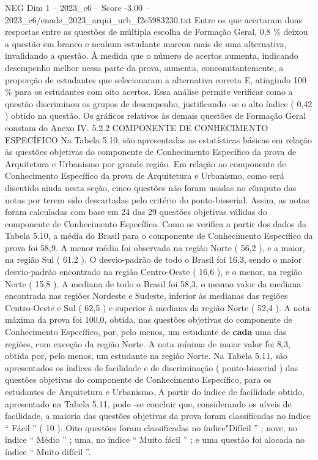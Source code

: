 \begin{textsample}{NEG Dim 1 – 2023\_c6 – Score -3.00 – 2023\_c6/enade\_2023\_arqui\_urb\_f2c5983230.txt}
Entre os que acertaram duas respostas entre as questões de múltipla escolha de Formação Geral, 0,8 \% deixou a questão em branco e nenhum estudante marcou mais de uma alternativa, invalidando a questão.
À medida que o número de acertos aumenta, indicando desempenho melhor nessa parte da prova, aumenta, concomitantemente, a proporção de estudantes que selecionaram a alternativa correta E, atingindo 100 \% para os estudantes com oito acertos.
Essa análise permite verificar como a questão discriminou os grupos de desempenho, justificando -se o alto índice ( 0,42 ) obtido na questão.
Os gráficos relativos às demais questões de Formação Geral constam do Anexo IV. 5.2.2 COMPONENTE DE CONHECIMENTO ESPECÍFICO Na Tabela 5.10, são apresentadas as estatísticas básicas em relação às questões objetivas do componente de Conhecimento Específico da prova de Arquitetura e Urbanismo por grande região.
Em relação ao componente de Conhecimento Específico da prova de Arquitetura e Urbanismo, como será discutido ainda nesta seção, cinco questões não foram usadas no cômputo das notas por terem sido descartadas pelo critério do ponto-bisserial.
Assim, as notas foram calculadas com base em 24 das 29 questões objetivas válidas do componente de Conhecimento Específico.
Como se verifica a partir dos dados da Tabela 5.10, a média do Brasil para o componente de Conhecimento Específico da prova foi 58,9.
A menor média foi observada na região Norte ( 56,2 ), e a maior, na região Sul ( 61,2 ).
O desvio-padrão de todo o Brasil foi 16,3, sendo o maior desvio-padrão encontrado na região Centro-Oeste ( 16,6 ), e o menor, na região Norte ( 15,8 ).
A mediana de todo o Brasil foi 58,3, o mesmo valor da mediana encontrada nas regiões Nordeste e Sudeste, inferior às medianas das regiões Centro-Oeste e Sul ( 62,5 ) e superior à mediana da região Norte ( 52,4 ).
A nota máxima da prova foi 100,0, obtida, nas questões objetivas do componente de Conhecimento Específico, por, pelo menos, um estudante de \textbf{cada} uma das regiões, com exceção da região Norte.
A nota mínima de maior valor foi 8,3, obtida por, pelo menos, um estudante na região Norte.
Na Tabela 5.11, são apresentados os índices de facilidade e de discriminação ( ponto-bisserial ) das questões objetivas do componente de Conhecimento Específico, para os estudantes de Arquitetura e Urbanismo.
A partir do índice de facilidade obtido, apresentado na Tabela 5.11, pode -se concluir que, considerando os níveis de facilidade, a maioria das questões objetivas da prova foram classificadas no índice “ Fácil ” ( 10 ).
Oito questões foram classificadas no índice"Difícil ” ; nove, no índice “ Médio ” ; uma, no índice “ Muito fácil ” ; e uma questão foi alocada no índice “ Muito difícil ”.

\end{textsample}
